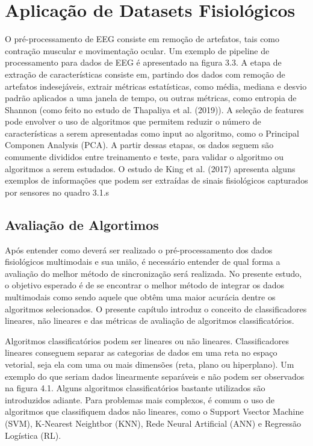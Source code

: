 \chapter{Aplicação de Datasets Fisiológicos}

O pré-processamento de EEG consiste em remoção de artefatos, 
tais como contração muscular e movimentação ocular.
Um exemplo de pipeline de processamento para dados de EEG é apresentado na figura 3.3.
A etapa de extração de características consiste em, partindo dos dados com 
remoção de artefatos indesejáveis, extrair métricas estatísticas, como média, 
mediana e desvio padrão aplicados a uma janela de tempo, ou outras métricas, como entropia de Shannon 
(como feito no estudo de Thapaliya et al. (2019)). A seleção de features pode 
envolver o uso de algoritmos que permitem reduzir o número de características a 
serem apresentadas como input ao algoritmo, como o Principal Componen Analysis (PCA).
 A partir dessas etapas, os dados seguem são comumente divididos entre treinamento e 
 teste, para validar o algoritmo ou algoritmos a serem estudados. 
 O estudo de King et al. (2017) apresenta alguns exemplos de informações que podem ser extraídas de sinais fisiológicos capturados por sensores no quadro 3.1.s

\section{Avaliação de Algortimos}

Após entender como deverá ser realizado o pré-processamento dos dados fisiológicos multimodais e sua união, 
é necessário entender de qual forma a avaliação do melhor método de sincronização será realizada. 
No presente estudo, o objetivo esperado é de se encontrar o melhor
método de integrar os dados multimodais como sendo aquele que obtêm uma maior acurácia dentre os 
algoritmos selecionados. O presente capítulo introduz o conceito de classificadores lineares,
não lineares e das métricas de avaliação de algoritmos classificatórios.


Algoritmos classificatórios
podem ser lineares ou não lineares. 
Classificadores lineares conseguem separar 
as categorias de dados em uma reta no espaço vetorial, seja ela com uma ou mais dimensões (reta, plano ou hiperplano). Um exemplo do que seriam dados linearmente separáveis e não podem ser observados na figura 4.1.
Alguns algoritmos classificatórios bastante utilizados são introduzidos adiante. Para problemas mais complexos,
é comum o uso de algoritmos que classifiquem dados não lineares, como o Support Vsector Machine (SVM), K-Nearest Neightbor (KNN), 
Rede Neural Artificial (ANN) e Regressão Logística (RL).

